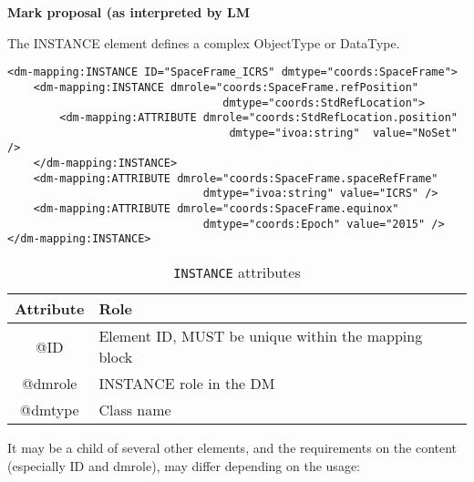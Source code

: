 
\textbf{Mark proposal (as interpreted by LM}

   The INSTANCE element defines a complex ObjectType or DataType.
   
\begin{lstlisting}[frame=single,caption={Example of INSTANCE child of GLOBALS},style=XML,basicstyle=\tiny]
<dm-mapping:INSTANCE ID="SpaceFrame_ICRS" dmtype="coords:SpaceFrame">
	<dm-mapping:INSTANCE dmrole="coords:SpaceFrame.refPosition"
                                 dmtype="coords:StdRefLocation">
		<dm-mapping:ATTRIBUTE dmrole="coords:StdRefLocation.position" 
		                          dmtype="ivoa:string"  value="NoSet" />
	</dm-mapping:INSTANCE>
	<dm-mapping:ATTRIBUTE dmrole="coords:SpaceFrame.spaceRefFrame" 
	                          dmtype="ivoa:string" value="ICRS" />
	<dm-mapping:ATTRIBUTE dmrole="coords:SpaceFrame.equinox" 
	                          dmtype="coords:Epoch"	value="2015" />
</dm-mapping:INSTANCE>
\end{lstlisting}   
   

\begin{table}[!htbp]
\small
\centering
\begin{tabulary}{\linewidth}{|c|J|}       
       \hline 
            \textbf{Attribute} & 
            \textbf {Role}\\
       \hline         \hline  
            @ID & 
            Element ID, MUST be unique within the mapping block  \\
        \hline 
            @dmrole & 
            INSTANCE role in the DM \\
        \hline 
            @dmtype & 
            Class name \\
        \hline 
     \end{tabulary}
     \caption{\texttt{INSTANCE} attributes} 
     \label{tbl:instance-att}
 \end{table}   
    It may be a child of several other elements, and the requirements on
    the content (especially ID and dmrole), may differ depending on
    the usage:
    

